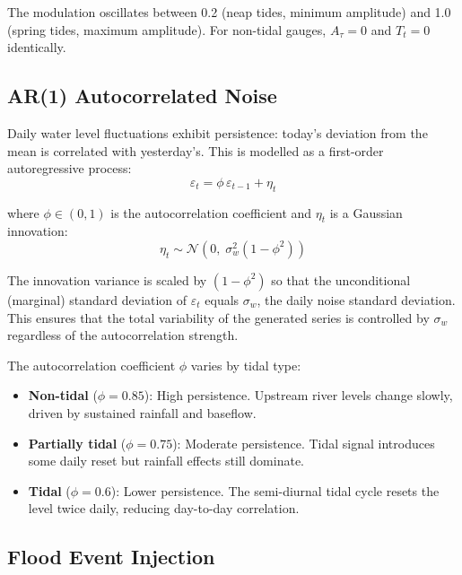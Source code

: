 \documentclass[11pt,a4paper]{article}
\begin{document}
\noindent The modulation oscillates between 0.2 (neap tides, minimum amplitude) and 1.0
(spring tides, maximum amplitude). For non-tidal gauges, $A_{\tau} = 0$ and $T_t = 0$
identically.

\subsection{AR(1) Autocorrelated Noise}
\label{sec:ar1}

Daily water level fluctuations exhibit persistence: today's deviation from the mean is
correlated with yesterday's. This is modelled as a first-order autoregressive process:
\begin{equation}
    \varepsilon_t = \phi\,\varepsilon_{t-1} + \eta_t
    \label{eq:ar1}
\end{equation}

\noindent where $\phi \in (0, 1)$ is the autocorrelation coefficient and $\eta_t$ is a
Gaussian innovation:
\begin{equation}
    \eta_t \sim \mathcal{N}\!\left(0,\; \sigma^2_w (1 - \phi^2)\right)
    \label{eq:innovation}
\end{equation}

\noindent The innovation variance is scaled by $(1 - \phi^2)$ so that the unconditional
(marginal) standard deviation of $\varepsilon_t$ equals $\sigma_w$, the daily noise
standard deviation. This ensures that the total variability of the generated series is
controlled by $\sigma_w$ regardless of the autocorrelation strength.

The autocorrelation coefficient $\phi$ varies by tidal type:
\begin{itemize}[nosep]
    \item \textbf{Non-tidal} ($\phi = 0.85$): High persistence. Upstream river levels
          change slowly, driven by sustained rainfall and baseflow.
    \item \textbf{Partially tidal} ($\phi = 0.75$): Moderate persistence. Tidal signal
          introduces some daily reset but rainfall effects still dominate.
    \item \textbf{Tidal} ($\phi = 0.6$): Lower persistence. The semi-diurnal tidal cycle
          resets the level twice daily, reducing day-to-day correlation.
\end{itemize}

\subsection{Flood Event Injection}
\end{document}
